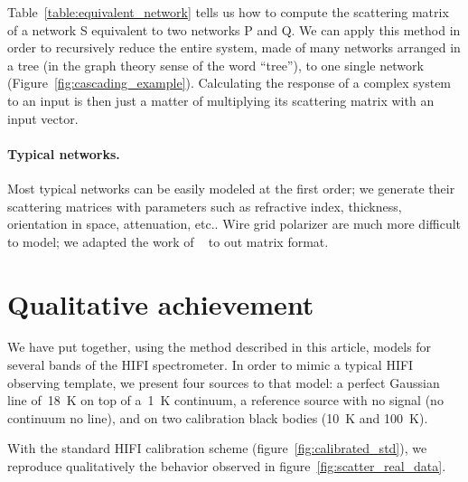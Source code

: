 \documentclass[a4paper,11pt]{article}
\begin{document}
Table~\ref{table:equivalent_network} tells us how to compute the scattering matrix of a network S equivalent to two networks P and Q.
We can apply this method in order to recursively reduce the entire system, made of many networks arranged in a tree (in the graph theory sense of the word ``tree''), to one single network (Figure~\ref{fig:cascading_example}).
Calculating the response of a complex system to an input is then just a matter of multiplying its scattering matrix with an input vector.

\paragraph{Typical networks.}
Most typical networks can be easily modeled at the first order;
we generate their scattering matrices with parameters such as refractive index, thickness, orientation in space, attenuation, etc..
Wire grid polarizer are much more difficult to model; we adapted the work of \citeauthor{houde_2001}~\cite{houde_2001} to out matrix format.




\section{Qualitative achievement}

We have put together, using the method described in this article, models for several bands of the HIFI spectrometer.
In order to mimic a typical HIFI observing template, we present four sources to that model: a perfect Gaussian line of~\SI{18}{\kelvin} on top of a~\SI{1}{\kelvin} continuum, a reference source with no signal (no continuum no line), and on two calibration black bodies (\SI{10}{\kelvin} and \SI{100}{\kelvin}).

With the standard HIFI calibration scheme (figure~\ref{fig:calibrated_std}), we reproduce qualitatively the behavior observed in figure~\ref{fig:scatter_real_data}.
\end{document}
